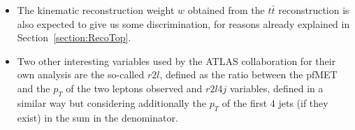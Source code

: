 \documentclass[a4paper, 10pt, openright]{report}
\begin{document}
\begin{itemize}
\item The kinematic reconstruction weight $w$ obtained from the $t \bar t$ reconstruction is also expected to give us some discrimination, for reasons already explained in Section~\ref{section:RecoTop}.


\item Two other interesting variables used by the \ac{ATLAS} collaboration \cite{PreviousDoubleTopBottomAllLep13ATLAS} for their own analysis are the so-called $r2l$, defined as the ratio between the pf\ac{MET} and the $p_T$ of the two leptons observed and $r2l4j$ variables, defined in a similar way but considering additionally the $p_T$ of the first 4 jets (if they exist) in the sum in the denominator.

%


\end{itemize}
\end{document}
